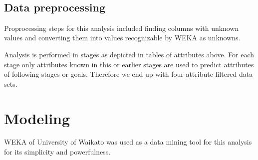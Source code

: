 \documentclass[11pt]{article}
\begin{document}
\mbox{}\\
\begin{table}[h]
\caption*{\bf Attributes after beginning of treatment}
\label{tab:attrs_treatment}
\end{table}

\subsection{Data preprocessing}
Proprocessing steps for this analysis included finding columns with unknown
values and converting them into values recognizable by WEKA as unknowns.

Analysis is performed in stages as depicted in tables of attributes above.  For
each stage only attributes known in this or earlier stages are used to predict
attributes of following stages or goals. Therefore we end up with four
attribute-filtered data sets.

\section{Modeling}
WEKA of University of Waikato was used as a data mining tool for this analysis
for its simplicity and powerfulness.




% 

% 
% 
\end{document}
